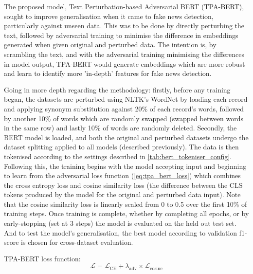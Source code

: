 \documentclass[stu,12pt,floatsintext,donotrepeattitle]{apa7}
\begin{document}
The proposed model, Text Perturbation-based Adversarial BERT (TPA-BERT), sought to improve generalisation when it came to fake news detection, particularly against unseen data. This was to be done by directly perturbing the text, followed by adversarial training to minimise the difference in embeddings generated when given original and perturbed data. The intention is, by scrambling the text, and with the adversarial training minimising the differences in model output, TPA-BERT would generate embeddings which are more robust and learn to identify more 'in-depth' features for fake news detection.

Going in more depth regarding the methodology: firstly, before any training began, the datasets are perturbed using NLTK's WordNet by loading each record and applying synonym substitution against 20\% of each record's words, followed by another 10\% of words which are randomly swapped (swapped between words in the same row) and lastly 10\% of words are randomly deleted. Secondly, the BERT model is loaded, and both the original and perturbed datasets undergo the dataset splitting applied to all models (described previously). The data is then tokenised according to the settings described in \ref{tab:bert_tokeniser_config}. Following this, the training begins with the model accepting input and beginning to learn from the adversarial loss function (\ref{eq:tpa_bert_loss}) which combines the cross entropy loss and cosine similarity loss (the difference between the CLS tokens produced by the model for the original and perturbed data input). Note that the cosine similarity loss is linearly scaled from 0 to 0.5 over the first 10\% of training steps. Once training is complete, whether by completing all epochs, or by early-stopping (set at 3 steps) the model is evaluated on the held out test set. And to test the model's generalisation, the best model according to validation f1-score is chosen for cross-dataset evaluation.

TPA-BERT loss function:
\begin{equation}
\mathcal{L} = \mathcal{L}_{\text{CE}} + \lambda_{\text{adv}} \times \mathcal{L}_{\text{cosine}}
\label{eq:tpa_bert_loss}
\end{equation}
\end{document}
